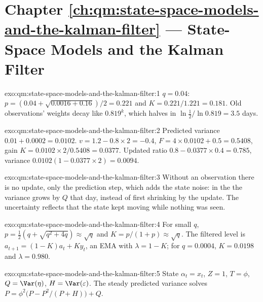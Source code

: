 \section*{Chapter \ref{ch:qm:state-space-models-and-the-kalman-filter} --- State-Space Models and the Kalman Filter}

\begin{solution}{exo:qm:state-space-models-and-the-kalman-filter:1}
$q = 0.04$: $p = (0.04 + \sqrt{0.0016 + 0.16})/2 = 0.221$ and $K = 0.221/1.221 = 0.181$. Old observations' weights decay like $0.819^k$, which halves in
$\ln\frac12/\ln0.819 = 3.5$ days.
\end{solution}

\begin{solution}{exo:qm:state-space-models-and-the-kalman-filter:2}
Predicted variance $0.01 + 0.0002 = 0.0102$.  $v = 1.2 - 0.8 \times 2 = -0.4$, $F = 4 \times 0.0102 + 0.5 = 0.5408$, gain $K = 0.0102 \times 2/0.5408 =
0.0377$. Updated ratio $0.8 - 0.0377 \times 0.4 = 0.785$, variance $0.0102(1 - 0.0377 \times 2) = 0.0094$.
\end{solution}

\begin{solution}{exo:qm:state-space-models-and-the-kalman-filter:3}
Without an observation there is no update, only the prediction step, which adds the state noise: in the  the variance grows by $Q$ that day,
instead of first shrinking by the update. The uncertainty reflects that the state kept moving while nothing was seen.
\end{solution}

\begin{solution}{exo:qm:state-space-models-and-the-kalman-filter:4}
For small $q$, $p = \frac12(q + \sqrt{q^2 + 4q}) \approx \sqrt q$ and $K = p/(1 + p) \approx \sqrt q$. The filtered level is $a_{t+1} = (1 - K)a_t + Ky_t$, an EMA with $\lambda
= 1 - K$; for $q = 0.0004$, $K = 0.0198$ and $\lambda = 0.980$.
\end{solution}

\begin{solution}{exo:qm:state-space-models-and-the-kalman-filter:5}
State $\alpha_t = x_t$, $Z = 1$, $T = \phi$, $Q = \Var(\eta)$, $H = \Var(\varepsilon)$. The steady predicted variance solves $P = \phi^2\bigl(P - P^2/(P + H)\bigr) + Q$.
\end{solution}

